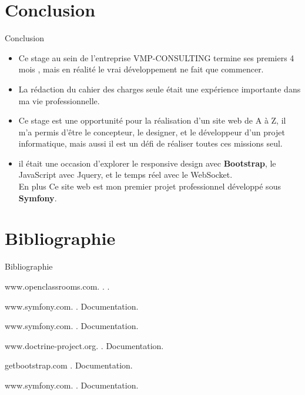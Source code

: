 \documentclass[french]{beamer}
\begin{document}
\section{Conclusion}
\begin{frame}{Conclusion}
	\begin{exampleblock}{}
	\begin{itemize}
	\item Ce stage au sein de l'entreprise VMP-CONSULTING termine ses premiers 4 mois , mais en réalité le vrai développement ne fait que commencer.
	\item La rédaction du cahier des charges seule était une expérience importante dans ma vie professionnelle.
	\item Ce stage est une opportunité pour la réalisation d'un site web de A à Z, il m'a permis d’être le concepteur, le designer, et le développeur d'un projet informatique, mais aussi il est un défi de réaliser toutes ces missions seul.
	\item il était une occasion d'explorer le responsive design avec \textbf{Bootstrap}, le JavaScript avec Jquery, et le temps réel avec le WebSocket.\\
En plus Ce site web est  mon premier projet professionnel développé sous \textbf{Symfony}.
	\end{itemize}
	\end{exampleblock}
\end{frame}


\section{Bibliographie}
\begin{frame}{Bibliographie}
	


\begin{thebibliography}{10}
    
  \beamertemplatebookbibitems

   www.openclassrooms.com.
    .
    \newblock .
 
   www.symfony.com.
    .
    \newblock Documentation.
    
    www.symfony.com.
    .
    \newblock Documentation.
    
   www.doctrine-project.org.
    .
    \newblock Documentation.

 getbootstrap.com
    .
    \newblock Documentation.
    
   
    
    
    www.symfony.com.
    .
    \newblock Documentation.
   
    
     
   
  \end{thebibliography}
\end{frame}
\end{document}
